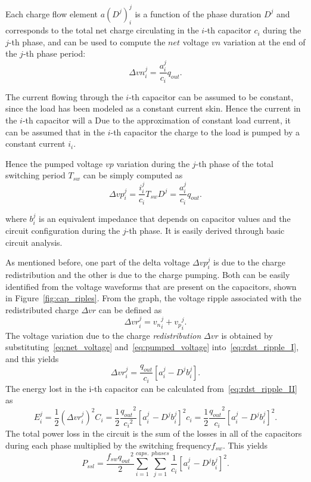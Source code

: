 Each charge flow element $ a(D^j)_i^j$  is a function of the phase duration $D^j$ and corresponds to the total net charge circulating in the $i$-th capacitor $c_i$ during the $j$-th phase, and can be used to compute the $net$ voltage $vn$ variation at the end of the $j$-th phase period:
\begin{equation}
\Delta {vn}^j_i  = \frac{a_i ^j }{c_i} q_{out} .
\label{eq:net_voltage}
\end{equation}

The current flowing through the $i$-th capacitor can be assumed to be constant, since the load has been modeled as a constant current skin. Hence the current in the $i$-th capacitor will a
Due to the approximation of constant load current, it can be assumed that in the $i$-th capacitor the charge to the load is pumped by a constant current $i_i$.

Hence the pumped voltage $vp$ variation during the $j$-th phase of the total switching period $T_{sw}$ can be simply computed as
\begin{equation}
\Delta {vp}^j_i  = \frac{i_i^j}{c_i} T_{sw} D^j = \frac{a_i ^j }{c_i} q_{out} .
\label{eq:pumped_voltage}
\end{equation}

where $b_i^j$ is an equivalent impedance that depends on capacitor values and the circuit configuration during the $j$-th phase. It is easily derived through basic circuit analysis.

As mentioned before, one part of the delta voltage $\Delta vp_i^j$ is due to the charge redistribution and the other is due to the charge pumping. Both can be easily identified from the voltage waveforms that are present on the capacitors, shown in Figure~\ref{fig:cap_riples}. From the graph, the voltage ripple associated with the redistributed charge $\Delta vr$ can be defined as
\begin{equation}
\Delta {vr}^j_i  = {v_n}^j_i + {v_p}^j_i .
\label{eq:rdst_ripple_I}
\end{equation}
The voltage variation due to the charge \emph{redistribution} $\Delta vr$  is obtained by substituting~\ref{eq:net_voltage} and~\ref{eq:pumped_voltage} into~\ref{eq:rdst_ripple_I}, and this yields
\begin{equation}
\Delta {vr}^j_i  = \frac{q_{out}}{c_i} \left[ a^j_i - D^j b^j_i \right] .
\label{eq:rdst_ripple_II}
\end{equation}
The energy lost in the i-th capacitor can be calculated from~\ref{eq:rdst_ripple_II} as
\begin{equation}
E_i^j=\frac{1}{2}{({\Delta{vr}}_i^j)}^2C_i=\frac{1}{2}\frac{{q_{out}}^2}{{c_i}^2}{\left[a_{i\
}^j-{D^j} {b_i^j}\right]}^2c_i=\frac{1}{2}\frac{{q_{out}}^2}{c_i}{\left[a_{i\
}^j-{D^j} {b_i^j}\right]}^2 .
\label{eq:e_lost_ssl}
\end{equation}
The total power loss in the circuit is the sum of the losses in all of the
capacitors during each phase multiplied by the switching frequency$f_{sw}$.
This yield{\small s}
\begin{equation}
P_{ssl}=\frac{f_{sw}{q_{out}}^2}{2}\sum_{i=1}^{caps.}\sum_{j=1}^{phases}\frac{1}{c_i}{\left[a_{i\
}^j-{D^j}{b_i^j}\right]}^2.
\label{eq:pwr_ssl}
\end{equation}

